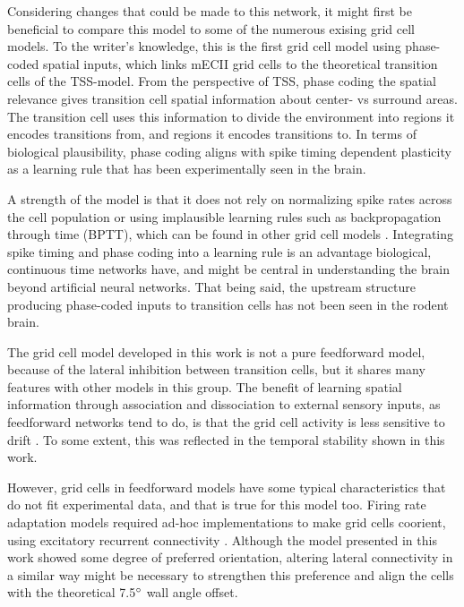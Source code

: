 \documentclass{article}
\begin{document}
    Considering changes that could be made to this network, it might first be beneficial to compare this model to some of the numerous exising grid cell models. To the writer's knowledge, this is the first grid cell model using phase-coded spatial inputs, which links mECII grid cells to the theoretical transition cells of the TSS-model. From the perspective of TSS, phase coding the spatial relevance gives transition cell spatial information about center- vs surround areas. The transition cell uses this information to divide the environment into regions it encodes transitions from, and regions it encodes transitions to. In terms of biological plausibility, phase coding aligns with spike timing dependent plasticity as a learning rule that has been experimentally seen in the brain. 
    
    A strength of the model is that it does not rely on normalizing spike rates across the cell population or using implausible learning rules such as backpropagation through time (BPTT), which can be found in other grid cell models \parencite{Kropff2008,Sorscher2023}. Integrating spike timing and phase coding into a learning rule is an advantage biological, continuous time networks have, and might be central in understanding the brain beyond artificial neural networks. That being said, the upstream structure producing phase-coded inputs to transition cells has not been seen in the rodent brain.
    
    The grid cell model developed in this work is not a pure feedforward model, because of the lateral inhibition between transition cells, but it shares many features with other models in this group. The benefit of learning spatial information through association and dissociation to external sensory inputs, as feedforward networks tend to do, is that the grid cell activity is less sensitive to drift \parencite{Mulas2016}. To some extent, this was reflected in the temporal stability shown in this work.

    However, grid cells in feedforward models have some typical characteristics that do not fit experimental data, and that is true for this model too. Firing rate adaptation models required ad-hoc implementations to make grid cells coorient, using excitatory recurrent connectivity \parencite{Barry2006,Si2013}. Although the model presented in this work showed some degree of preferred orientation, altering lateral connectivity in a similar way might be necessary to strengthen this preference and align the cells with the theoretical 7.5\(\degree\) wall angle offset.
\end{document}
